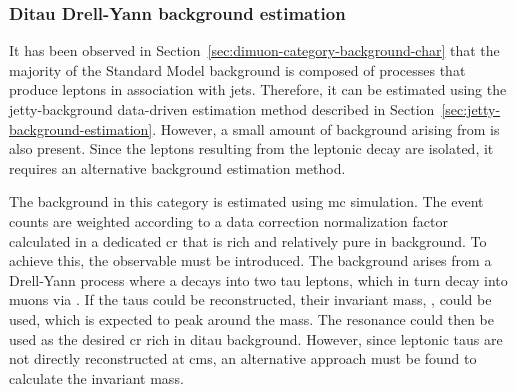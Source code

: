 \subsubsection{Ditau Drell-Yann background estimation}
\label{sec:mtautau-background-estimation}

It has been observed in Section~\ref{sec:dimuon-category-background-char} that the majority of the Standard Model background is composed of processes that produce leptons in association with jets. Therefore, it can be estimated using the jetty-background data-driven estimation method described in Section~\ref{sec:jetty-background-estimation}. However, a small amount of background arising from \ztautau is also present. Since the leptons resulting from the leptonic decay \tautomu are isolated, it requires an alternative background estimation method.

The \ztautau background in this category is estimated using \gls{mc} simulation. The event counts are weighted according to a data correction normalization factor calculated in a dedicated \gls{cr} that is rich and relatively pure in \ztautau background. To achieve this, the observable \mtautau must be introduced. The background arises from a Drell-Yann process where a \PZ decays into two tau leptons, which in turn decay into muons via \tautomu. If the taus could be reconstructed, their invariant mass, \mtautau, could be used, which is expected to peak around the \PZ mass. The \PZ resonance could then be used as the desired \gls{cr} rich in ditau background. However, since leptonic taus are not directly reconstructed at \gls{cms}, an alternative approach must be found to calculate the invariant mass.

